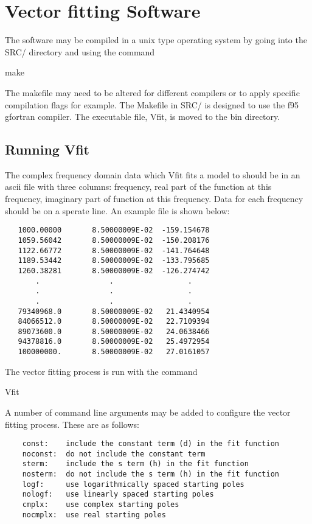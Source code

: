 \section{Vector fitting Software} \label{software}

The software may be compiled in a unix type operating system by going into the SRC/ directory and using the command

make

The makefile may need to be altered for different compilers or to apply specific compilation flags for example. The Makefile in SRC/ is designed to use the f95 gfortran compiler. The executable file, Vfit, is moved to the bin directory.

\subsection{Running Vfit}

The complex frequency domain data which Vfit fits a model to should be in an ascii file with three columns: frequency, real part of the function at this frequency, imaginary part of function at this frequency. Data for each frequency should be on a sperate line. An example file is shown below:

\begin{verbatim}
   1000.00000       8.50000009E-02  -159.154678         
   1059.56042       8.50000009E-02  -150.208176         
   1122.66772       8.50000009E-02  -141.764648         
   1189.53442       8.50000009E-02  -133.795685         
   1260.38281       8.50000009E-02  -126.274742         
       .                .                 .
       .                .                 .
       .                .                 .
   79340968.0       8.50000009E-02   21.4340954         
   84066512.0       8.50000009E-02   22.7109394         
   89073600.0       8.50000009E-02   24.0638466         
   94378816.0       8.50000009E-02   25.4972954         
   100000000.       8.50000009E-02   27.0161057         
\end{verbatim}

The vector fitting process is run with the command

Vfit

A number of command line arguments may be added to configure the vector fitting process. These are as follows:

\begin{verbatim}
    const:    include the constant term (d) in the fit function
    noconst:  do not include the constant term
    sterm:    include the s term (h) in the fit function
    nosterm:  do not include the s term (h) in the fit function
    logf:     use logarithmically spaced starting poles
    nologf:   use linearly spaced starting poles
    cmplx:    use complex starting poles
    nocmplx:  use real starting poles
\end{verbatim}

